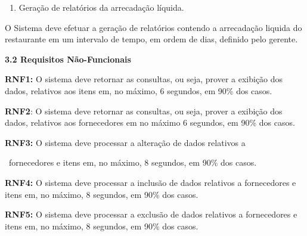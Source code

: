 \liststyleWWNumi
\setcounter{saveenum}{\value{enumi}}
\begin{enumerate}
\setcounter{enumi}{\value{saveenum}}
\item {
\textcolor[rgb]{0.078431375,0.09411765,0.13725491}{Geração de relatórios da arrecadação líquida.}}
\end{enumerate}
{
\textcolor[rgb]{0.078431375,0.09411765,0.13725491}{O Sistema deve efetuar a geração de relatórios contendo a arrecadação
liquida do restaurante em um intervalo de tempo, em ordem de dias, definido pelo gerente.}}


\bigskip

{
\textbf{\textcolor[rgb]{0.078431375,0.09411765,0.13725491}{3.2 Requisitos Não-Funcionais}}}


\bigskip

{
\textbf{\textcolor[rgb]{0.078431375,0.09411765,0.13725491}{RNF1:}}\textcolor[rgb]{0.078431375,0.09411765,0.13725491}{ O
sistema deve retornar as consultas, ou seja, prover a exibição dos dados, relativos aos itens em, no máximo, 6
segundos, em 90\% dos casos.}}

{
\textbf{\textcolor[rgb]{0.078431375,0.09411765,0.13725491}{RNF2}}\textcolor[rgb]{0.078431375,0.09411765,0.13725491}{: O
sistema deve retornar as consultas, ou seja, prover a exibição dos dados, relativos aos fornecedores em no máximo 6
segundos, em 90\% dos casos.}}

{
\textbf{\textcolor[rgb]{0.078431375,0.09411765,0.13725491}{RNF3:}}\textcolor[rgb]{0.078431375,0.09411765,0.13725491}{ O
sistema deve processar a alteração de dados relativos a}}

{
\textcolor[rgb]{0.078431375,0.09411765,0.13725491}{\ fornecedores e itens em, no máximo, 8 segundos, em 90\% dos
casos.}}

{
\textbf{\textcolor[rgb]{0.078431375,0.09411765,0.13725491}{RNF4:}}\textcolor[rgb]{0.078431375,0.09411765,0.13725491}{ O
sistema deve processar a inclusão de dados relativos a fornecedores e itens em, no máximo, 8 segundos, em 90\% dos
casos.}}

{
\textbf{\textcolor[rgb]{0.078431375,0.09411765,0.13725491}{RNF5:}}\textcolor[rgb]{0.078431375,0.09411765,0.13725491}{ O
sistema deve processar a exclusão de dados relativos a fornecedores e itens em, no máximo, 8 segundos, em 90\% dos
casos.}}

